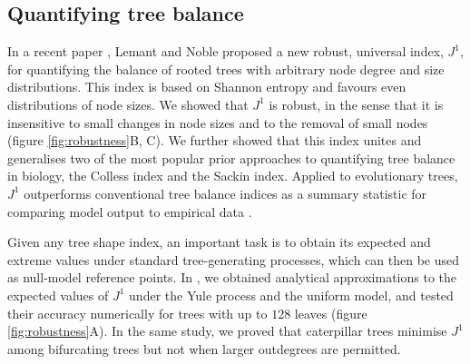 \subsection{Quantifying tree balance}
In a recent paper \cite{lemant_robust_2022}, Lemant and Noble proposed a new robust, universal index, $J^1$, for quantifying the
balance of rooted trees with arbitrary node degree and size distributions. This index is based on
Shannon entropy and favours even distributions of node sizes. We showed that $J^1$ is robust, in the sense
that it is insensitive to small changes in node sizes and to the removal of small nodes (figure \ref{fig:robustness}B, C).
We further showed that this index unites and generalises two of the most
popular prior approaches to quantifying tree balance in biology, the Colless index and the Sackin index.
Applied to evolutionary trees, $J^1$ outperforms conventional tree balance indices as a summary statistic
for comparing model output to empirical data \cite{noble_spatial_2022}.\par
Given any tree shape index, an important task is to obtain its expected and extreme values under standard
tree-generating processes, which can then be used as null-model reference points. In \cite{lemant_robust_2022}, we
obtained analytical approximations to the expected values of $J^1$ under the Yule process and the uniform
model, and tested their accuracy numerically for trees with up to $128$ leaves (figure \ref{fig:robustness}A). In the
same study, we proved that caterpillar trees minimise $J^1$ among bifurcating trees but not when larger
outdegrees are permitted.\par

